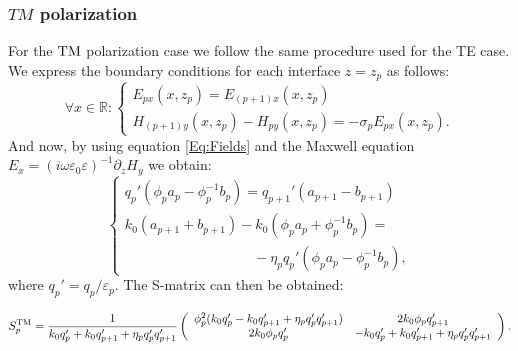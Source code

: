 \documentclass[aps,pra,superscriptaddress,amsmath,amssymb,showpacs,twocolumn,notitlepage]{revtex4-1}
\begin{document}
\subsubsection{$TM$ polarization} 
For the $\rm{TM}$ polarization case we follow the same procedure used for the TE case. We express the boundary conditions  for each interface $z=z_p$ as follows:
\begin{equation} \label{Eq:TM_BondCond1}
\forall x \in \mathbb{R}: \left\{ \begin{array}{ll}
E_{px}(x,z_p)=E_{(p+1)x}(x,z_p) \\ H_{(p+1)y}(x,z_p)-H_{py}(x,z_p)=-\sigma_pE_{px}(x,z_p).
\end{array} \right. 
\end{equation}
And now, by using equation \eqref{Eq:Fields} and the Maxwell equation $E_x=(i\omega\varepsilon_0\varepsilon)^{-1}\partial_zH_y$ we obtain:
%
\begin{equation} \label{Eq:TE_BondCond2}
\left\{ \begin{array}{ll}
q_p'( \phi_pa_p-\phi_p^{-1}b_p)=q_{p+1}'(a_{p+1}-b_{p+1})  \\ k_0 \left( a_{p+1}+b_{p+1} \right) - k_0 \left( \phi_pa_p+\phi_p^{-1}b_p \right)= \\ \;\;\;\;\;\;\;\;\;\;\;\;\;\;\;\;\;\;\;\;\;\;\;\;\;\;\;\;\;\;\;\;\;-\eta_p q_p'\left(\phi_pa_p-\phi_p^{-1}b_p \right),
\end{array} \right. 
\end{equation}
%
where $q_p'=q_p/\varepsilon_p$. The S-matrix can then be obtained:
\begin{widetext}
\begin{equation} \label{Eq:TE_BondCond_Smat2}
S_p^{\rm{TM}}=\dfrac{1}{k_0q_p'+k_0q_{p+1}'+\eta_pq_p'q_{p+1}'}\left(\begin{array}{cc}  \phi_p^2(k_0q_p'-k_0q_{p+1}'+\eta_pq_p'q_{p+1}' ) & 2k_0  \phi_p q_{p+1}' \\  2  k_0 \phi_p q_p'  & -k_0q_p'+k_0q_{p+1}'+\eta_pq_p'q_{p+1}' \end{array} \right).
\end{equation}
\end{widetext} 
\end{document}

